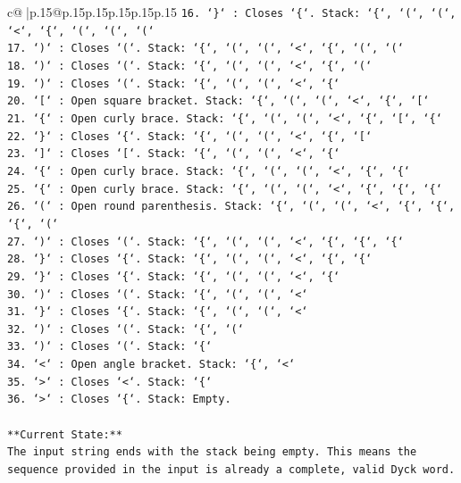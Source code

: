 \documentclass{article}
\begin{document}
{\begin{supertabular}{c@{$\;$}|p{.15\linewidth}@{}p{.15\linewidth}p{.15\linewidth}p{.15\linewidth}p{.15\linewidth}p{.15\linewidth}}
{{{\texttt{16. `\}` : Closes `\{`. Stack: `\{`, `(`, `(`, `<`, `\{`, `(`, `(`, `(`} \\
\texttt{17. `)` : Closes `(`. Stack: `\{`, `(`, `(`, `<`, `\{`, `(`, `(`} \\
\texttt{18. `)` : Closes `(`. Stack: `\{`, `(`, `(`, `<`, `\{`, `(`} \\
\texttt{19. `)` : Closes `(`. Stack: `\{`, `(`, `(`, `<`, `\{`} \\
\texttt{20. `{[}` : Open square bracket. Stack: `\{`, `(`, `(`, `<`, `\{`, `{[}`} \\
\texttt{21. `\{` : Open curly brace. Stack: `\{`, `(`, `(`, `<`, `\{`, `{[}`, `\{`} \\
\texttt{22. `\}` : Closes `\{`. Stack: `\{`, `(`, `(`, `<`, `\{`, `{[}`} \\
\texttt{23. `{]}` : Closes `{[}`. Stack: `\{`, `(`, `(`, `<`, `\{`} \\
\texttt{24. `\{` : Open curly brace. Stack: `\{`, `(`, `(`, `<`, `\{`, `\{`} \\
\texttt{25. `\{` : Open curly brace. Stack: `\{`, `(`, `(`, `<`, `\{`, `\{`, `\{`} \\
\texttt{26. `(` : Open round parenthesis. Stack: `\{`, `(`, `(`, `<`, `\{`, `\{`, `\{`, `(`} \\
\texttt{27. `)` : Closes `(`. Stack: `\{`, `(`, `(`, `<`, `\{`, `\{`, `\{`} \\
\texttt{28. `\}` : Closes `\{`. Stack: `\{`, `(`, `(`, `<`, `\{`, `\{`} \\
\texttt{29. `\}` : Closes `\{`. Stack: `\{`, `(`, `(`, `<`, `\{`} \\
\texttt{30. `)` : Closes `(`. Stack: `\{`, `(`, `(`, `<`} \\
\texttt{31. `\}` : Closes `\{`. Stack: `\{`, `(`, `(`, `<`} \\
\texttt{32. `)` : Closes `(`. Stack: `\{`, `(`} \\
\texttt{33. `)` : Closes `(`. Stack: `\{`} \\
\texttt{34. `<` : Open angle bracket. Stack: `\{`, `<`} \\
\texttt{35. `>` : Closes `<`. Stack: `\{`} \\
\texttt{36. `>` : Closes `\{`. Stack: Empty.} \\
\\ 
\texttt{**Current State:**} \\
\texttt{The input string ends with the stack being empty. This means the sequence provided in the input is already a complete, valid Dyck word.} \\
}}}
\end{supertabular}}
\end{document}
